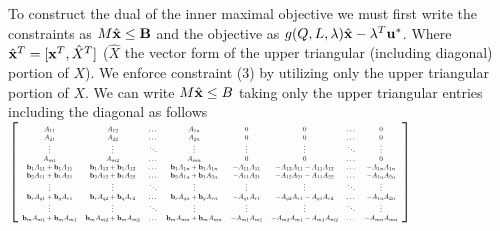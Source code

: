 To construct the dual of the inner maximal objective we must first write the constraints as $M\hat{\mathbf{x}} \leq \mathbf{B}$ and the objective as $g(Q,L,\lambda)\hat{\mathbf{x}}-\lambda^T\mathbf{u}^*$. Where $\hat{\mathbf{x}}^T=[\mathbf{x}^T,\hat{X}^T]$ ($\hat{X}$ the vector form of the upper triangular (including diagonal) portion of $X$). 
We enforce constraint (3) by utilizing only the upper triangular portion of $X$. We can write $M\hat{\mathbf{x}}\leq B$ taking only the upper triangular entries including the diagonal as follows\\

$\left[
\scalebox{0.5}{%
	\begin{tabular}{ c c c c c c c c}
	$A_{11}$ & $A_{12}$ & $\dots$ & $A_{1n}$ & $0$ & $0$ & $\dots$ & $0$ \\ 
	$A_{21}$ & $A_{22}$ & $\dots$ & $A_{2n}$ & $0$ & $0$ & $\dots$ & $0$ \\  
	$\vdots$ & $\vdots$ & $\ddots$ & $\vdots$ & $\vdots$ & $\vdots$ & $\ddots$ & $\vdots$\\
	$A_{m1}$ & $A_{m2}$ & $\dots$ & $A_{mn}$ & $0$ & $0$ & $\dots$ & $0$ \\
	$\vb_1A_{11}+\vb_1A_{11}$ & $\vb_1A_{12}+\vb_1A_{12}$ & $\dots$ & $\vb_1A_{1n}+\vb_1A_{1n}$ & $-A_{11}A_{11}$ & $-A_{12}A_{11}-A_{11}A_{12}$ & $\dots$ & $-A_{1n}A_{1n}$ \\ 
	$\vb_2A_{11}+\vb_1A_{21}$ & $\vb_2A_{12}+\vb_1A_{22}$ & $\dots$ & $\vb_2A_{1n}+\vb_1A_{2n}$ & $-A_{11}A_{21}$ & $-A_{12}A_{21}-A_{11}A_{22}$ & $\dots$ & $-A_{1n}A_{2n}$ \\ 
	$\vdots$ & $\vdots$ & $\ddots$ & $\vdots$ & $\vdots$ & $\vdots$ & $\ddots$ & $\vdots$\\
	$\vb_rA_{q1}+\vb_qA_{r1}$ & $\vb_rA_{q2}+\vb_qA_{r2}$ & $\dots$ & $\vb_rA_{qn}+\vb_qA_{rn}$ & $-A_{q1}A_{r1}$ & $-A_{q2}A_{r1}-A_{q1}A_{r2}$ & $\dots$ & $-A_{1n}A_{2n}$ \\ 
	$\vdots$ & $\vdots$ & $\ddots$ & $\vdots$ & $\vdots$ & $\vdots$ & $\ddots$ & $\vdots$\\
	$\vb_mA_{m1}+\vb_mA_{m1}$ & $\vb_mA_{m2}+\vb_mA_{m2}$ & $\dots$ & $\vb_mA_{mn}+\vb_mA_{mn}$ & $-A_{m1}A_{m1}$ & $-A_{m2}A_{m1}-A_{m1}A_{m2}$ & $\dots$ & $-A_{mn}A_{mn}$ 
	\end{tabular}%
} 
\right]$
